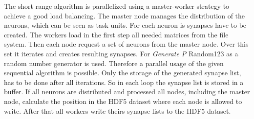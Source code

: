 \documentclass[a4paper]{article}
\begin{document}
The short range algorithm is parallelized using a master-worker strategy to achieve a good load balancing.
The master node manages the distribution of the neurons, which can be seen as task units. For each neuron 
is synapses have to be created. The workers load in the first step all needed matrices from the file system.
Then each node request a set of neurons from the master node. Over this set it iterates and creates resulting
synapses. For \emph{Generate P} Random123 as a random number generator is used. Therefore a parallel usage of 
the given sequential algorithm is possible. Only the storage of the generated synapse list, has to be done 
after all iterations. So in each loop the synapse list is stored in a buffer.
If all neurons are distributed and processed all nodes, including the master node, calculate the position in 
the HDF5 dataset where each node is allowed to write. After that all workers write theirs synapse lists to
the HDF5 dataset.
\end{document}
